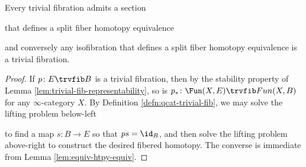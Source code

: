 \begin{lem}\label{lem:split-triv-fib} Every trivial fibration admits a section
\begin{center}
\end{center}
that defines a split fiber homotopy equivalence
\begin{center}
\end{center}
and conversely any isofibration that defines a split fiber homotopy equivalence is a trivial fibration.
\end{lem}
\begin{proof}
If $p \colon E \trvfib B$ is a trivial fibration, then by the stability property of Lemma \ref{lem:trivial-fib-representability}, so is $p_*\colon\Fun(X,E)\trvfib Fun(X,B)$ for any $\infty$-category $X$.  By Definition \ref{defn:qcat-trivial-fib}, we may solve the lifting problem below-left
\begin{center}
\end{center}
to find a map $s \colon B \to E$ so that $ps = \id_B$, and then solve the lifting problem above-right to construct the desired fibered homotopy. The converse is immediate from Lemma \ref{lem:equiv-htpy-equiv}.
\end{proof}

